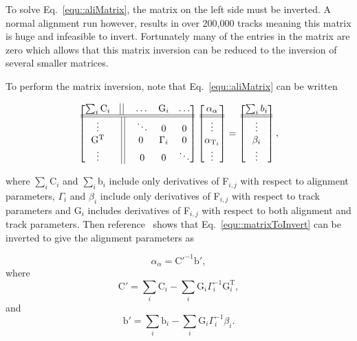 \noindent
To solve Eq.~\ref{equ::aliMatrix}, the matrix on the left side must be inverted.
A normal alignment run however, results in over 200,000 tracks meaning this
matrix is huge and infeasible to invert.  Fortunately many of the entries in the
matrix are zero which allows that this matrix inversion can be reduced to
the inversion of several smaller matrices.

To perform the matrix inversion, note that Eq.~\ref{equ::aliMatrix} can be
written

\begin{equation}
  \label{equ::matrixToInvert}
  \begin{bmatrix}
    \sum_{i} \mathrm{C}_i & \vline \; \vline \; & \dots &
    \mathrm{G}_i & \dots \\
    \hline \hline
    \vdots & \vline \; \vline & \ddots & 0 & 0 \\
    \mathrm{G}^{\mathrm{T}} & \vline \; \vline & 0 \; & \Gamma_i & 0 \\
    \vdots & \vline \; \vline & 0 & 0 & \ddots
  \end{bmatrix}
  \begin{bmatrix}
    \alpha_{\alpha} \\ \hline \hline \vdots \\ \alpha_{\mathrm{T}_i}
    \\ \vdots
  \end{bmatrix}
  =
  \begin{bmatrix}
    \sum_i b_i \\ \hline \hline \vdots \\ \beta_i \\ \vdots
  \end{bmatrix},
\end{equation}

\noindent
where $\sum_i$C$_i$ and $\sum_i$b$_i$ include only derivatives of F$_{i,j}$ with
respect to alignment parameters, $\Gamma_i$ and $\beta_i$ include only
derivatives of F$_{i,j}$ with respect to track parameters and G$_i$ includes
derivatives of F$_{i,j}$ with respect to both alignment and track parameters.
Then reference~\cite{matrix_inv} shows that Eq.~\ref{equ::matrixToInvert} can be
inverted to give the alignment parameters as

\begin{equation}
\alpha_{\alpha} = \mathrm{C'}^{-1}\mathrm{b}',
\end{equation}
\noindent
where
\begin{equation}
\mathrm{C}' = \sum_i \mathrm{C}_i - \sum_i \mathrm{G}_i \Gamma_i^{-1}
\mathrm{G}_i^{\mathrm{T}},
\end{equation}
\noindent
and
\begin{equation}
\mathrm{b}' = \sum_i \mathrm{b}_i - \sum_i \mathrm{G}_i \Gamma_i^{-1}\beta_i.
\end{equation}


